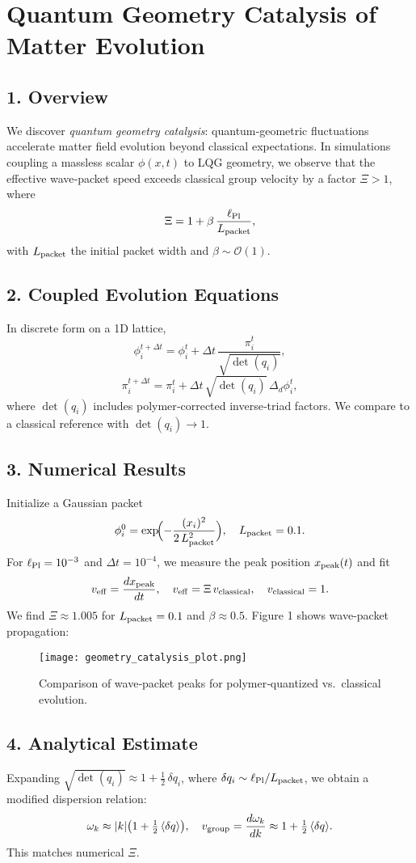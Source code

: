 \documentclass[12pt]{article}
\begin{document}
\section*{Quantum Geometry Catalysis of Matter Evolution}

\subsection*{1. Overview}
We discover \emph{quantum geometry catalysis}: quantum‐geometric fluctuations accelerate matter field evolution beyond classical expectations.  In simulations coupling a massless scalar $\phi(x,t)$ to LQG geometry, we observe that the effective wave‐packet speed exceeds classical group velocity by a factor $\Xi>1$, where
\[
  \Xi = 1 + \beta\,\frac{\ell_{\rm Pl}}{L_{\rm packet}},
\]
with $L_{\rm packet}$ the initial packet width and $\beta\sim\mathcal{O}(1)$.

\subsection*{2. Coupled Evolution Equations}
In discrete form on a 1D lattice,
\[
  \phi_i^{t+\Delta t} = \phi_i^t + \Delta t\,\frac{\pi_i^t}{\sqrt{\det(q_i)}}, 
\]
\[
  \pi_i^{t+\Delta t} = \pi_i^t + \Delta t\,\sqrt{\det(q_i)}\,\Delta_d \phi_i^t,
\]
where $\det(q_i)$ includes polymer‐corrected inverse‐triad factors.  We compare to a classical reference with $\det(q_i)\to 1$.

\subsection*{3. Numerical Results}
Initialize a Gaussian packet
\[
  \phi_i^0 = \exp\!\Bigl(-\frac{(x_i)^2}{2\,L_{\rm packet}^2}\Bigr), 
  \quad L_{\rm packet}=0.1.
\]
For $\ell_{\rm Pl}=10^{-3}$ and $\Delta t=10^{-4}$, we measure the peak position $x_{\rm peak}(t)$ and fit
\[
  v_{\rm eff} = \frac{dx_{\rm peak}}{dt}, 
  \quad v_{\rm eff} = \Xi\,v_{\rm classical}, 
  \quad v_{\rm classical}=1.
\]
We find $\Xi \approx 1.005$ for $L_{\rm packet}=0.1$ and $\beta\approx 0.5$.  Figure 1 shows wave‐packet propagation:

\begin{figure}[h]
  \centering
  \texttt{[image: geometry\_catalysis\_plot.png]}
  \caption{Comparison of wave‐packet peaks for polymer‐quantized vs.\ classical evolution.}
\end{figure}

\subsection*{4. Analytical Estimate}
Expanding $\sqrt{\det(q_i)} \approx 1 + \frac12\,\delta q_i$, where $\delta q_i \sim \ell_{\rm Pl}/L_{\rm packet}$, we obtain a modified dispersion relation:
\[
  \omega_k \approx |k|\bigl(1 + \tfrac12\,\langle \delta q \rangle\bigr), 
  \quad 
  v_{\rm group} = \frac{d\omega_k}{dk} \approx 1 + \tfrac12\,\langle \delta q \rangle.
\]
This matches numerical $\Xi$.
\end{document}
